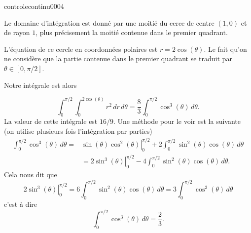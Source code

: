 \begin{corrige}{controlecontinu0004}


Le domaine d'intégration est donné par une moitié du cerce de centre $(1,0)$ et de rayon $1$, plus précisement la moitié contenue dans le premier quadrant. 

L'équation de ce cercle en  coordonnées polaires est $r=2\cos(\theta)$. Le fait qu'on ne considère que la partie contenue dans le premier quadrant se traduit par $\theta\in[0,\pi/2]$. 

Notre intégrale est alors 

\[
\int_0^{\pi/2}\int_0^{2\cos(\theta)} r^2\, dr\,d\theta= \frac{8}{3}\int_0^{\pi/2}\cos^3(\theta) \, d\theta. 
\]
La valeur de cette intégrale est $16/9$. Une méthode pour le voir est la suivante (on utilise plusieurs fois l'intégration par parties)   
\begin{equation}
  \begin{aligned}
    \int_0^{\pi/2}\cos^3(\theta) \, d\theta=& \left.\sin(\theta)\cos^2(\theta)\right\vert_0^{\pi/2} + 2\int_0^{\pi/2}\sin^2(\theta)\cos(\theta) \, d\theta\\
    &= \left.2\sin^3(\theta)\right\vert_0^{\pi/2} - 4\int_0^{\pi/2}\sin^2(\theta)\cos(\theta) \, d\theta.
  \end{aligned}
\end{equation}
Cela nous  dit que 
\begin{equation}
  \left.2\sin^3(\theta)\right\vert_0^{\pi/2} = 6\int_0^{\pi/2}\sin^2(\theta)\cos(\theta) \, d\theta=3\int_0^{\pi/2}\cos^3(\theta) \, d\theta
\end{equation}
c'est à dire 
\[
\int_0^{\pi/2}\cos^3(\theta) \, d\theta=\frac{2}{3}.
\]
\end{corrige}
